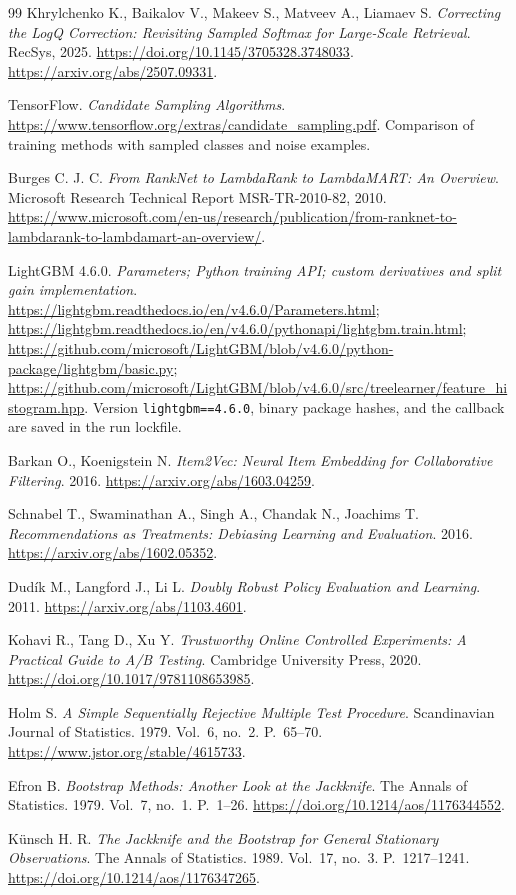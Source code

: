 \documentclass[12pt,a4paper]{article}
\newcommand{\code}[1]{{\ttfamily\small\nolinkurl{#1}}}
\theoremstyle{plainru}
\begin{document}
\begin{thebibliography}{99}
Khrylchenko K., Baikalov V., Makeev S., Matveev A., Liamaev S.
\emph{Correcting the LogQ Correction: Revisiting Sampled Softmax
for Large-Scale Retrieval}.
RecSys, 2025. \url{https://doi.org/10.1145/3705328.3748033}.
\url{https://arxiv.org/abs/2507.09331}.

TensorFlow. \emph{Candidate Sampling Algorithms}.
\url{https://www.tensorflow.org/extras/candidate_sampling.pdf}.
Comparison of training methods with sampled classes and noise examples.

Burges C. J. C.
\emph{From RankNet to LambdaRank to LambdaMART: An Overview}.
Microsoft Research Technical Report MSR-TR-2010-82, 2010.
\url{https://www.microsoft.com/en-us/research/publication/from-ranknet-to-lambdarank-to-lambdamart-an-overview/}.

LightGBM 4.6.0. \emph{Parameters; Python training API;
custom derivatives and split gain implementation}.
\url{https://lightgbm.readthedocs.io/en/v4.6.0/Parameters.html};
\url{https://lightgbm.readthedocs.io/en/v4.6.0/pythonapi/lightgbm.train.html};
\url{https://github.com/microsoft/LightGBM/blob/v4.6.0/python-package/lightgbm/basic.py};
\url{https://github.com/microsoft/LightGBM/blob/v4.6.0/src/treelearner/feature_histogram.hpp}.
Version \code{lightgbm==4.6.0}, binary package hashes, and the callback
are saved in the run lockfile.

Barkan O., Koenigstein N.
\emph{Item2Vec: Neural Item Embedding for Collaborative Filtering}.
2016. \url{https://arxiv.org/abs/1603.04259}.

Schnabel T., Swaminathan A., Singh A., Chandak N., Joachims T.
\emph{Recommendations as Treatments: Debiasing Learning and Evaluation}.
2016. \url{https://arxiv.org/abs/1602.05352}.

Dud\'ik M., Langford J., Li L.
\emph{Doubly Robust Policy Evaluation and Learning}.
2011. \url{https://arxiv.org/abs/1103.4601}.

Kohavi R., Tang D., Xu Y.
\emph{Trustworthy Online Controlled Experiments:
A Practical Guide to A/B Testing}.
Cambridge University Press, 2020.
\url{https://doi.org/10.1017/9781108653985}.

Holm S. \emph{A Simple Sequentially Rejective Multiple Test Procedure}.
Scandinavian Journal of Statistics. 1979. Vol.~6, no.~2. P.~65--70.
\url{https://www.jstor.org/stable/4615733}.

Efron B.
\emph{Bootstrap Methods: Another Look at the Jackknife}.
The Annals of Statistics. 1979. Vol.~7, no.~1. P.~1--26.
\url{https://doi.org/10.1214/aos/1176344552}.

Künsch H. R.
\emph{The Jackknife and the Bootstrap for General Stationary Observations}.
The Annals of Statistics. 1989. Vol.~17, no.~3. P.~1217--1241.
\url{https://doi.org/10.1214/aos/1176347265}.

\end{thebibliography}
\endgroup
\end{document}
